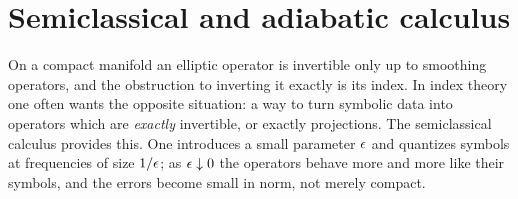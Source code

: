 \chapter{Semiclassical and adiabatic calculus}\label{ch:semiclassical}
\providecommand{\Psisl}[1]{\Psi^{#1}_{\mathrm{sl}}}
\providecommand{\Ssl}[1]{S^{#1}_{\mathrm{sl}}}
\providecommand{\Sslph}[1]{S^{#1}_{\mathrm{sl,ph}}}
\providecommand{\Psislph}[1]{\Psi^{#1}_{\mathrm{sl,ph}}}
\providecommand{\ssl}{\sigma_{\mathrm{sl}}}
\providecommand{\sad}{\sigma_{\mathrm{ad}}}
\providecommand{\Psiad}{\Psi^{-\infty}_{\mathrm{ad}}}
\providecommand{\Psisa}{\Psi^{-\infty}_{\mathrm{sl,ad}}}
\providecommand{\Qcl}[2]{\mathcal{Q}^{#1}_{#2}}
\providecommand{\Amp}[2]{\mathcal{A}^{#1}_{#2}}

On a compact manifold an elliptic operator is invertible only up to smoothing
operators, and the obstruction to inverting it exactly is its index. In index
theory one often wants the opposite situation: a way to turn symbolic data
into operators which are \emph{exactly} invertible, or exactly projections.
The semiclassical calculus provides this. One introduces a small parameter
$\epsilon$ and quantizes symbols at frequencies of size $1/\epsilon$; as
$\epsilon\downarrow0$ the operators behave more and more like their symbols, and
the errors become small in norm, not merely compact.

